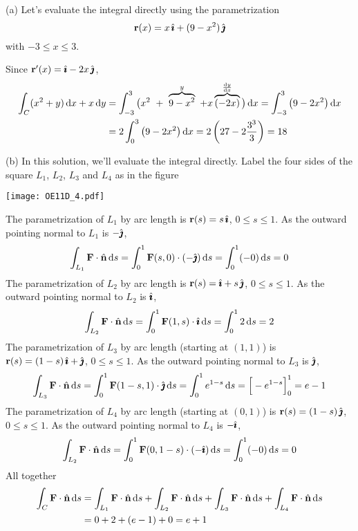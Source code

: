 \begin{solution} (a)
Let's evaluate the integral directly using the parametrization
\begin{equation*}
\mathbf{r}(x) = x\,\hat{\pmb{\imath}} +(9-x^2)\,\hat{\pmb{\jmath}}
\end{equation*}
with $-3\le x \le 3$.

Since $\mathbf{r}'(x) = \hat{\pmb{\imath}} -2x\,\hat{\pmb{\jmath}}$,
\begin{align*}
\int_C (x^2 + y)\,\dee{x} + x\,\dee{y}
&=\int_{-3}^3 \big(x^2\ +\  \overbrace{9-x^2}^{y}\ 
          +x\overbrace{(-2x)}^{\diff{y}{x}}\big)\,\dee{x}
=\int_{-3}^3 \big(9-2x^2\big)\,\dee{x} \\
&=2\int_0^3 \big(9-2x^2\big)\,\dee{x}
=2\left(27-2\frac{3^3}{3}\right)
=18
\end{align*}

\noindent (b)  In this solution, we'll evaluate the
integral directly. Label the four sides of the square $L_1$, $L_2$, $L_3$ and
$L_4$ as in the figure

 \begin{center}
       \texttt{[image: OE11D\_4.pdf]}
\end{center}

The parametrization of $L_1$ by arc length is $\mathbf{r}(s) = s\,\hat{\pmb{\imath}}$, $0\le s\le 1$.
As the outward pointing normal to $L_1$ is $-\hat{\pmb{\jmath}}$,
\begin{align*}
\int_{L_1} \mathbf{F} \cdot\hat{\mathbf{n}}\, \mathrm{d}s
=\int_0^1 \mathbf{F}(s,0) \cdot(-\hat{\pmb{\jmath}})\, \mathrm{d}s
=\int_0^1 (-0)\, \mathrm{d}s
=0
\end{align*}
The parametrization of $L_2$ by arc length is $\mathbf{r}(s) = \hat{\pmb{\imath}}+s\,\hat{\pmb{\jmath}}$, 
$0\le s\le 1$. As the outward pointing normal to $L_2$ is $\hat{\pmb{\imath}}$,
\begin{align*}
\int_{L_2} \mathbf{F} \cdot\hat{\mathbf{n}}\, \mathrm{d}s
=\int_0^1 \mathbf{F}(1,s) \cdot \hat{\pmb{\imath}}\, \mathrm{d}s
=\int_0^1 2\, \mathrm{d}s
=2
\end{align*}
The parametrization of $L_3$ by arc length (starting at $(1,1)$)
is $\mathbf{r}(s) = (1-s)\,\hat{\pmb{\imath}}+\hat{\pmb{\jmath}}$, $0\le s\le 1$.
As the outward pointing normal to $L_3$ is $\hat{\pmb{\jmath}}$,
\begin{align*}
\int_{L_3} \mathbf{F} \cdot\hat{\mathbf{n}}\, \mathrm{d}s
=\int_0^1 \mathbf{F}(1-s,1) \cdot\hat{\pmb{\jmath}}\, \mathrm{d}s
=\int_0^1 e^{1-s}\, \mathrm{d}s
=\Big[-e^{1-s}\Big]_0^1
=e-1
\end{align*}
The parametrization of $L_4$ by arc length (starting at $(0,1)$)
is $\mathbf{r}(s) = (1-s)\,\hat{\pmb{\jmath}}$,  $0\le s\le 1$. As the outward pointing 
normal to $L_4$ is $-\hat{\pmb{\imath}}$,
\begin{align*}
\int_{L_2} \mathbf{F} \cdot\hat{\mathbf{n}}\, \mathrm{d}s
=\int_0^1 \mathbf{F}(0,1-s) \cdot(- \hat{\pmb{\imath}})\, \mathrm{d}s
=\int_0^1 (-0)\, \mathrm{d}s
=0
\end{align*}
All together
\begin{align*}
\int_C \vF \cdot\hn\, \dee{s}
&= \int_{L_1} \vF \cdot\hn\, \dee{s}
   +\int_{L_2} \vF \cdot\hn\, \dee{s} %
   +\int_{L_3} \vF \cdot\hn\, \dee{s}
   +\int_{L_4} \vF \cdot\hn\, \dee{s}  \\
&= 0+2+(e-1) +0 
=e+1
\end{align*}



\end{solution}
